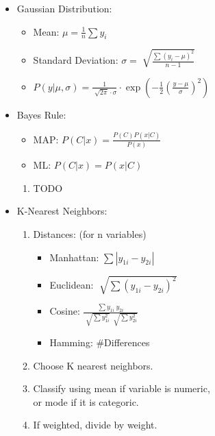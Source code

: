 \documentclass[twocolumn, 10pt]{article}
\begin{document}
\begin{itemize}[leftmargin=*, itemsep=0pt]
    \item Gaussian Distribution:
    \begin{itemize}[topsep=0pt, itemsep=0pt]
        \item Mean: $\displaystyle \mu=\frac{1}{n}\sum y_i$
        \item Standard Deviation: $\displaystyle \sigma=\sqrt[]{\frac{\sum(y_i-\mu)^2}{n-1}}$
        \item $\displaystyle  P(y|\mu,\sigma)=\frac{1}{\sqrt[]{2\pi}\cdot\sigma}\cdot\exp\left(-\frac{1}{2}\left(\frac{y-\mu}{\sigma}\right)^2\right)$
    \end{itemize}

    \newpage
    \item Bayes Rule: 
    \begin{itemize}[topsep=0pt, itemsep=0pt]
        \item MAP: $\displaystyle P(C|x)=\frac{P(C)P(x|C)}{P(x)}$
        \item ML: $\displaystyle P(C|x)=P(x|C)$
    \end{itemize}
    \begin{enumerate}[topsep=0pt, itemsep=0pt]
        \item TODO
    \end{enumerate}
    
    \item K-Nearest Neighbors:
    \begin{enumerate}[topsep=0pt, itemsep=0pt]
        \item Distances: (for n variables)
        \begin{itemize}[topsep=0pt]
            \item Manhattan: $\displaystyle \sum |y_{1i}-y_{2i}|$
            \item Euclidean: $\displaystyle \sqrt[]{\sum (y_{1i}-y_{2i})^2}$
            \item Cosine: $\displaystyle \frac{\sum y_{1i}\ y_{2i}}
            {\sqrt[]{\sum y_{1i}^2}\ \sqrt[]{\sum y_{2i}^2}}$
            \item Hamming: \#Differences
        \end{itemize}
        \item Choose K nearest neighbors.
        \item Classify using mean if variable is numeric, \\
        or mode if it is categoric.
        \item If weighted, divide by weight.
    \end{enumerate}


\end{itemize}
\end{document}
